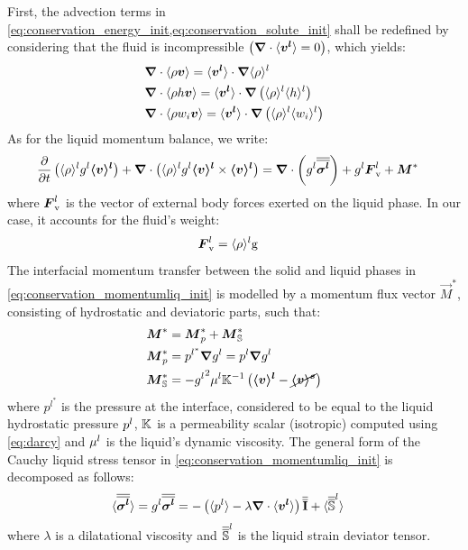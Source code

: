 First, the advection terms in \cref{eq:conservation_energy_init,eq:conservation_solute_init}
shall be redefined by considering that the fluid is incompressible $\left( \boldsymbol{\nabla} \cdot \langle \boldsymbol{v^l} \rangle = 0 \right)$, which yields:
\begin{align}
\label{eq:constantrhol_mass}
& \nabvec \cdot \avg{\rho \vec{v}} = \vit \cdot \nabvec \rhol \\
\label{eq:constantrhol_energy}
& \nabvec \cdot \avg{\rho h \vec{v}} = \vit \cdot \nabvec \brac{\rhol \hl} \\
\label{eq:constantrhol_solute}
& \nabvec \cdot \avg{\rho w_i \vec{v}} = \vit \cdot \nabvec \brac{\rhol \wil}
\end{align}
As for the liquid momentum balance, we write:
\begin{align}
\label{eq:conservation_momentumliq_init}
& \temp{ \rhol \gl \vl } + \nabvec \cdot \brac{\rhol \gl \vl \times \vl} = 
	\nabvec \cdot \brac{\gl \sigmal} +\gl \Fv + \vec{M}^{*}
\end{align}
where $\boldsymbol{F}_{\text{v}}^l$ is the vector of external body forces exerted on the liquid phase. In our case, it accounts for the fluid's weight:
\begin{align}
\label{eq:fluid_weight}
& \Fv = \rhol \gravity
\end{align}
The interfacial momentum transfer between the solid and liquid phases in \cref{eq:conservation_momentumliq_init} is modelled 
by a momentum flux vector $\vec{M}^{*}$, consisting of hydrostatic and deviatoric parts, such that:
\begin{align}
	\label{eq:interfacial_momentum_total}
	& \vec{M}^{*} =  \vec{M}^{*}_{p} + \vec{M}^{*}_{\mathbb{S}}	\\
	\label{eq:interfacial_momentum_hydrostatic}
	& \vec{M}^{*}_{p} = p^{l^{*}} \nabvec g^{l} = p^{l} \nabvec g^{l}		\\
	\label{eq:interfacial_momentum_deviatoric}
	& \vec{M}^{*}_{\mathbb{S}} = - \gl^2 \mul \K^{-1} \brac{ \vl - \cancel{\vs} }  
\end{align}
where $p^{l^{*}}$ is the pressure at the interface, considered to be equal to the liquid hydrostatic 
pressure ${p^l}$, $\mathbb{K}$ is a permeability scalar (isotropic) computed using \cref{eq:darcy} and $\mu^l$ is the liquid's 
dynamic viscosity. The general form of the Cauchy liquid stress tensor in \cref{eq:conservation_momentumliq_init} 
is decomposed as follows: 
\begin{align}
\label{eq:stress_liq}
& \avg{\sigmal} = \gl \sigmal = - \brac{\avg{\pl} -\lambda \nabvec \cdot \vit} \I + \avg{\mat{\mathbb{S}}^{l}}
\end{align}
where $\lambda$ is a dilatational viscosity \citep{dantzig_solidification_2009} and ${\overline{\overline{\boldsymbol{\mathbb{S}}}}}^{l}$ is the
liquid strain deviator tensor. 

